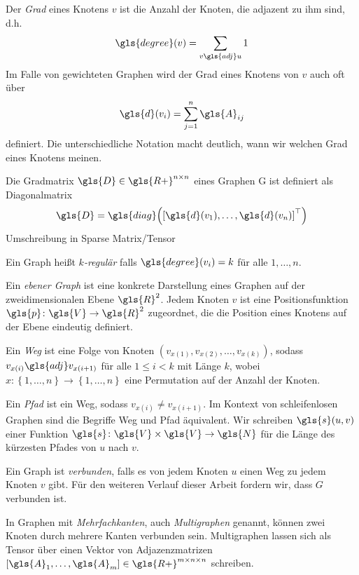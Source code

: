 Der \emph{Grad} eines Knotens $v$ ist die Anzahl der Knoten, die adjazent zu ihm sind, d.h.
\begin{equation}
  \gls{degree}\left(v\right) = \sum_{v \gls{adj} u} 1
\end{equation}
Im Falle von gewichteten Graphen wird der Grad eines Knotens von $v$ auch oft über
\begin{equation}
  \gls{d}\left(v_i\right) = \sum^n_{j=1} \gls{A}_{ij}
\end{equation}
definiert.
Die unterschiedliche Notation macht deutlich, wann wir welchen Grad eines Knotens meinen.

Die Gradmatrix $\gls{D} \in \gls{R+}^{n \times n}$ eines Graphen \gls{G} ist definiert als Diagonalmatrix
\begin{equation}
  \gls{D} = \gls{diag}\left( {\left[ \gls{d}\left(v_1\right), \ldots, \gls{d}\left(v_n\right) \right]}^{\top} \right)
\end{equation}
Umschreibung in Sparse Matrix/Tensor


Ein Graph heißt \emph{$k$-regulär} falls $\gls{degree}\left(v_i\right) = k$ für alle $1, \ldots, n$.

Ein \emph{ebener Graph} ist eine konkrete Darstellung eines Graphen auf der zweidimensionalen Ebene $\gls{R}^2$.
Jedem Knoten $v$ ist eine Positionsfunktion $\gls{p} \colon \gls{V} \to \gls{R}^2$ zugeordnet, die die Position eines Knotens auf der Ebene eindeutig definiert.

Ein \emph{Weg} ist eine Folge von Knoten $\left( v_{x\left(1\right)}, v_{x\left(2\right)}, \ldots, v_{x\left(k\right)} \right)$, sodass $v_{x\left(i\right)} \gls{adj} v_{x\left(i+1\right)}$ für alle $1 \leq i < k$ mit Länge $k$, wobei $x \colon \left\{ 1, \ldots, n \right\} \to \left\{ 1, \ldots, n \right\}$ eine Permutation auf der Anzahl der Knoten.

Ein \emph{Pfad} ist ein Weg, sodass $v_{x\left(i\right)} \neq v_{x\left(i+1\right)}$.
Im Kontext von schleifenlosen Graphen sind die Begriffe Weg und Pfad äquivalent.
Wir schreiben $\gls{s}\left(u, v\right)$ einer Funktion $\gls{s} \colon \gls{V} \times \gls{V} \to \gls{N}$ für die Länge des kürzesten Pfades von $u$ nach $v$.

Ein Graph ist \emph{verbunden}, falls es von jedem Knoten $u$ einen Weg zu jedem Knoten $v$ gibt.
Für den weiteren Verlauf dieser Arbeit fordern wir, dass $G$ verbunden ist.\

In Graphen mit \emph{Mehrfachkanten}, auch \emph{Multigraphen} genannt, können zwei Knoten durch mehrere Kanten verbunden sein.
Multigraphen lassen sich als Tensor über einen Vektor von Adjazenzmatrizen $\left[\gls{A}_1, \ldots, \gls{A}_m\right] \in \gls{R+}^{m \times n \times n}$ schreiben.
